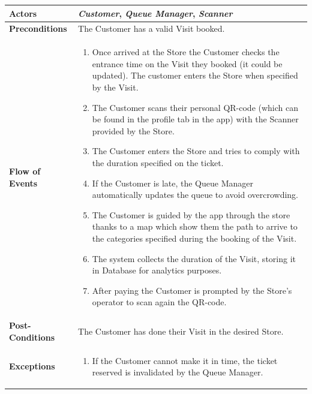 \documentclass[a4paper, 12pt, oneside]{article}
\begin{document}
\begin{enumerate}[labelindent=20pt, label={UC.\arabic*}, itemindent=1em,leftmargin=!]
\begin{tabularx}{\linewidth}{| l | X |}

	\hline
	\textbf{Actors} & \textbf{\textit{Customer}}, \textit{\textbf{Queue Manager}}, \textit{\textbf{Scanner}}  \\
	
	\hline
	\textbf{Preconditions} & The Customer has a valid Visit booked.\\
	
	\hline
	\textbf{Flow of Events} & \parbox{0.7\textwidth}{	
		\begin{enumerate}
			\item Once arrived at the Store the Customer checks the entrance time on the Visit they booked (it could be updated). The customer enters the Store when specified by the Visit.
			\item The Customer scans their personal QR-code (which can be found in the profile tab in the app) with the Scanner provided by the Store.
			\item The Customer enters the Store and tries to comply with the duration specified on the ticket.
			\item If the Customer is late, the Queue Manager automatically updates the queue to avoid overcrowding.
			\item The Customer is guided by the app through the store thanks to a map which show them the path to arrive to the categories specified during the booking of the Visit.
			\item The system collects the duration of the Visit, storing it in Database for analytics purposes.
			\item After paying the Customer is prompted by the Store's operator to scan again the QR-code.
	\end{enumerate}}\\
	
	\hline
	\textbf{Post-Conditions} & The Customer has done their Visit in the desired Store.\\
	
	\hline
	\textbf{Exceptions} & \parbox{0.7\textwidth}{ \begin{enumerate}
			\item If the Customer cannot make it in time, the ticket reserved is invalidated by the Queue Manager.
		\end{enumerate}}\\

	\hline
\end{tabularx}


\end{enumerate}
\end{document}
